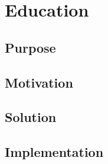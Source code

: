 \chapter{Education}

\section{Purpose}

\section{Motivation}

\section{Solution}

\section{Implementation}